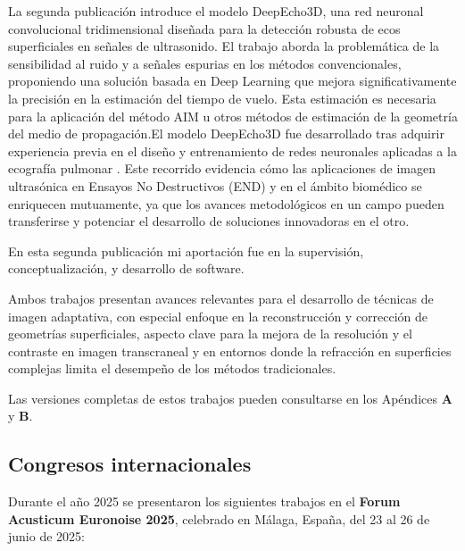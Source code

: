 \documentclass[10pt,a4paper]{article}
\begin{document}
La segunda publicación \cite{Munoz2025} introduce el modelo DeepEcho3D, una red neuronal convolucional tridimensional diseñada para la detección robusta de ecos superficiales en señales de ultrasonido. El trabajo aborda la problemática de la sensibilidad al ruido y a señales espurias en los métodos convencionales, proponiendo una solución basada en Deep Learning que mejora significativamente la precisión en la estimación del tiempo de vuelo. Esta estimación es necesaria para la aplicación del método AIM u otros métodos de estimación de la geometría del medio de propagación.El modelo DeepEcho3D fue desarrollado tras adquirir experiencia previa en el diseño y entrenamiento de redes neuronales aplicadas a la ecografía pulmonar \cite{Munoz2024}. Este recorrido evidencia cómo las aplicaciones de imagen ultrasónica en Ensayos No Destructivos (END) y en el ámbito biomédico se enriquecen mutuamente, ya que los avances metodológicos en un campo pueden transferirse y potenciar el desarrollo de soluciones innovadoras en el otro.

En esta segunda publicación mi aportación fue en la supervisión, conceptualización, y desarrollo de software.

Ambos trabajos presentan avances relevantes para el desarrollo de técnicas de imagen adaptativa, con especial enfoque en la reconstrucción y corrección de geometrías superficiales, aspecto clave para la mejora de la resolución y el contraste en imagen transcraneal y en entornos donde la refracción en superficies complejas limita el desempeño de los métodos tradicionales.

Las versiones completas de estos trabajos pueden consultarse en los Apéndices \textbf{A} y \textbf{B}.

\subsection{Congresos internacionales}\label{sec:congresos}

Durante el año 2025 se presentaron los siguientes trabajos en el \textbf{Forum Acusticum Euronoise 2025}, celebrado en Málaga, España, del 23 al 26 de junio de 2025:
\end{document}
